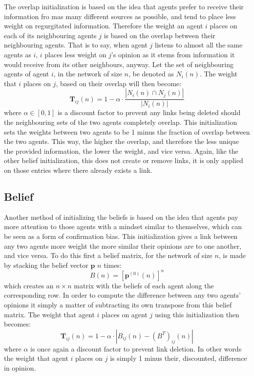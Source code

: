 \documentclass{article}
\newcommand{\T}{\textbf{T}}
\begin{document}
The overlap initialization is based on the idea that agents prefer to receive their information fro mas many different sources as possible, and tend to place less weight on regurgitated information. Therefore the weight an agent $i$ places on each of its neighbouring agents $j$ is based on the overlap between their neighbouring agents. That is to say, when agent $j$ listens to almost all the same agents as $i$, $i$ places less weight on $j$'s opinion as it stems from information it would receive from its other neighbours, anyway. Let the set of neighbouring agents of agent $i$, in the network of size $n$, be denoted as $N_i(n)$. The weight that $i$ places on $j$, based on their overlap will then become:
\begin{equation}
    \T_{ij}(n) = 1 - \alpha \cdot \frac{|N_i(n) \cap N_j(n)|}{|N_i(n)|}
\end{equation}
where $\alpha \in [0, 1]$ is a discount factor to prevent any links being deleted should the neighbouring sets of the two agents completely overlap. This initialization sets the weights between two agents to be 1 minus the fraction of overlap between the two agents. This way, the higher the overlap, and therefore the less unique the provided information, the lower the weight, and vice versa. Again, like the other belief initialization, this does not create or remove links, it is only applied on those entries where there already exists a link.

\newpage

\subsection{Belief}

Another method of initializing the beliefs is based on the idea that agents pay more attention to those agents with a mindset similar to themselves, which can be seen as a form of confirmation bias. This initialization gives a link between any two agents more weight the more similar their opinions are to one another, and vice versa. To do this first a belief matrix, for the network of size $n$, is made  by stacking the belief vector $\textbf{p}$ $n$ times:
\begin{equation}
    B(n) = [\textbf{p}^{(0)}(n)]^{n}
\end{equation}
which creates an $n \times n$ matrix with the beliefs of each agent along the corresponding row. In order to compute the difference between any two agents' opinions it simply a matter of subtracting its own transpose from this belief matrix.
The weight that agent $i$ places on agent $j$ using this initialization then becomes:
\begin{equation}
    \T_{ij}(n) = 1 - \alpha \cdot |B_{ij}(n) - (B^{T})_{ij}(n)|
\end{equation}
where $\alpha$ is once again a discount factor to prevent link deletion. In other words the weight that agent $i$ places on $j$ is simply 1 minus their, discounted, difference in opinion.
\end{document}
